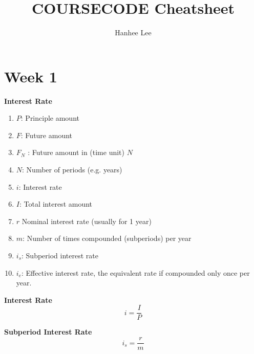 \documentclass{article}
\title{COURSECODE Cheatsheet}
\author{Hanhee Lee}
\begin{document}
    \maketitle

    \tableofcontents

    \listoffigures

    \listoftables

    \section{Week 1}
    \begin{terminology}
        \textbf{Interest Rate}
        \begin{enumerate}
            \item \(P\): Principle amount
            \item \(F\): Future amount 
            \item \(F_N\) : Future amount in (time unit) \(N\)
            \item \(N\): Number of periods (e.g. years)
            \item \(i\): Interest rate 
            \item \(I\): Total interest amount 
            \item \(r\) Nominal interest rate (usually for 1 year)
            \item \(m\): Number of times compounded (subperiods) per year
            \item \(i_s\): Subperiod interest rate
            \item \(i_e\): Effective interest rate, the equivalent rate if compounded only once per year.
        \end{enumerate}
    \end{terminology}

    \begin{definition}
        \textbf{Interest Rate}
        \begin{equation}
            i = \frac{I}{P}
        \end{equation}
    \end{definition}

    \begin{definition}
        \textbf{Subperiod Interest Rate}
        \begin{equation}
            i_s = \frac{r}{m}
        \end{equation}
    \end{definition}
\end{document}
